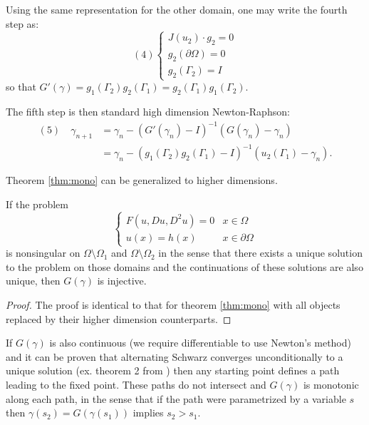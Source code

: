 \documentclass{article}
\begin{document}
Using the same representation for the other domain, one may write the fourth step as:
\begin{equation*}
(4) \begin{cases} J(u_2) \cdot g_2 = 0 \\
g_2(\partial \Omega) = 0 \\
g_2(\Gamma_2) = I \end{cases}
\end{equation*}
so that $G'(\gamma) = g_1(\Gamma_2) g_2(\Gamma_1) = g_2(\Gamma_1) g_1(\Gamma_2)$.

The fifth step is then standard high dimension Newton-Raphson:
\begin{align*}
(5) \quad \gamma_{n+1} & = \gamma_n - (G'(\gamma_n) - I)^{-1} (G(\gamma_n) - \gamma_n) \\
					   & = \gamma_n - (g_1(\Gamma_2) g_2(\Gamma_1) - I)^{-1} (u_2(\Gamma_1) - \gamma_n).
\end{align*}

Theorem \ref{thm:mono} can be generalized to higher dimensions.

\begin{thm}
If the problem
\begin{equation*}
	\begin{cases} F(u,Du,D^2u) = 0 & x \in \Omega \\ u(x) = h(x) & x \in \partial \Omega \end{cases}
\end{equation*}
is nonsingular on $\Omega \setminus \Omega_1$ and $\Omega \setminus \Omega_2$ in the sense that there exists a unique solution to the problem on those domains and the continuations of these solutions are also unique, then $G(\gamma)$ is injective.
\end{thm}

\begin{proof}
The proof is identical to that for theorem \ref{thm:mono} with all objects replaced by their higher dimension counterparts.
\end{proof}

If $G(\gamma)$ is also continuous (we require differentiable to use Newton's method) and it can be proven that alternating Schwarz converges unconditionally to a unique solution (ex. theorem 2 from \cite{lui1999schwarz}) then any starting point defines a path leading to the fixed point.
These paths do not intersect and $G(\gamma)$ is monotonic along each path, in the sense that if the path were parametrized by a variable $s$ then $\gamma(s_2) = G(\gamma(s_1))$ implies $s_2>s_1$.
\end{document}
